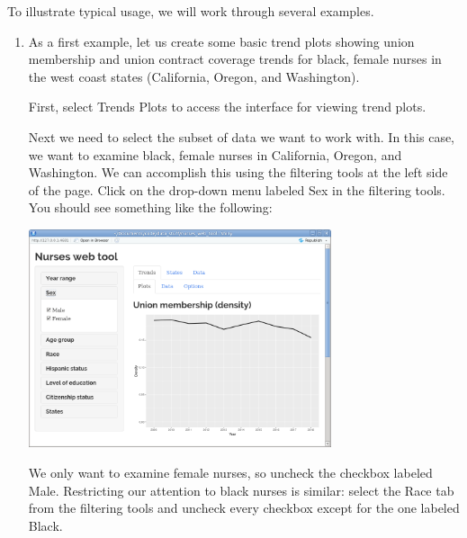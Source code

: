 \documentclass[letterpaper,12pt]{article}
\begin{document}
To illustrate typical usage, we will work through several examples.
\begin{enumerate}
\item As a first example, let us create some basic trend plots showing
  union membership and union contract coverage trends for black,
  female nurses in the west coast states (California, Oregon, and
  Washington).

  First, select Trends \textrightarrow{} Plots to access the interface
  for viewing trend plots.

  Next we need to select the subset of data we want to work with. In
  this case, we want to examine black, female nurses in California,
  Oregon, and Washington. We can accomplish this using the filtering
  tools at the left side of the page. Click on the drop-down menu
  labeled Sex in the filtering tools. You should see something like
  the following:
  \begin{center}
    \includegraphics[width=0.7\textwidth]{images/trends_ex1/sex_selection.png}
  \end{center}
  We only want to examine female nurses, so uncheck the checkbox
  labeled Male. Restricting our attention to black nurses is similar:
  select the Race tab from the filtering tools and uncheck every
  checkbox except for the one labeled Black.


\end{enumerate}
\end{document}
